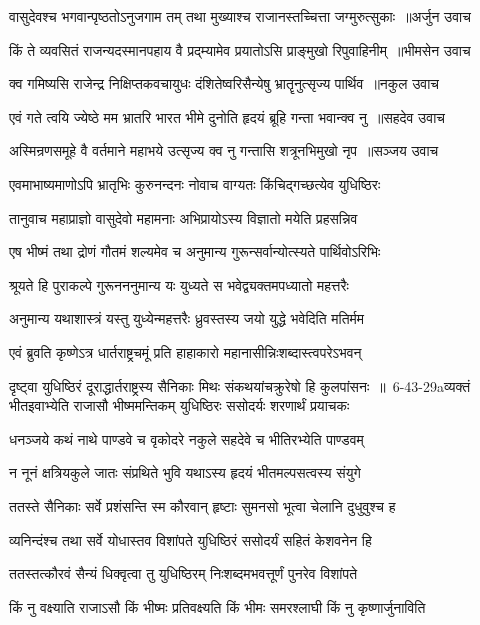 \threelineshloka
{वासुदेवश्च भगवान्पृष्ठतोऽनुजगाम तम्}
{तथा मुख्याश्च राजानस्तच्चित्ता जग्मुरुत्सुकाः ॥अर्जुन उवाच}
{}


\threelineshloka
{किं ते व्यवसितं राजन्यदस्मानपहाय वै}
{प्रद्म्यामेव प्रयातोऽसि प्राङ्मुखो रिपुवाहिनीम् ॥भीमसेन उवाच}
{}


\threelineshloka
{क्व गमिष्यसि राजेन्द्र निक्षिप्तकवचायुधः}
{दंशितेष्वरिसैन्येषु भ्रातॄनुत्सृज्य पार्थिव ॥नकुल उवाच}
{}


\threelineshloka
{एवं गते त्वयि ज्येष्ठे मम भ्रातरि भारत}
{भीमे दुनोति हृदयं ब्रूहि गन्ता भवान्क्व नु ॥सहदेव उवाच}
{}


\threelineshloka
{अस्मिन्रणसमूहे वै वर्तमाने महाभये}
{उत्सृज्य क्व नु गन्तासि शत्रूनभिमुखो नृप ॥सञ्जय उवाच}
{}


\twolineshloka
{एवमाभाष्यमाणोऽपि भ्रातृभिः कुरुनन्दनः}
{नोवाच वाग्यतः किंचिद्गच्छत्येव युधिष्ठिरः}


\twolineshloka
{तानुवाच महाप्राज्ञो वासुदेवो महामनाः}
{अभिप्रायोऽस्य विज्ञातो मयेति प्रहसन्निव}


\twolineshloka
{एष भीष्मं तथा द्रोणं गौतमं शल्यमेव च}
{अनुमान्य गुरून्सर्वान्योत्स्यते पार्थिवोऽरिभिः}


\twolineshloka
{श्रूयते हि पुराकल्पे गुरूनननुमान्य यः}
{युध्यते स भवेद्व्यक्तमपध्यातो महत्तरैः}


\twolineshloka
{अनुमान्य यथाशास्त्रं यस्तु युध्येन्महत्तरैः}
{ध्रुवस्तस्य जयो युद्धे भवेदिति मतिर्मम}


\twolineshloka
{एवं ब्रुवति कृष्णेऽत्र धार्तराष्ट्रचमूं प्रति}
{हाहाकारो महानासीन्निःशब्दास्त्वपरेऽभवन्}


\threelineshloka
{दृष्ट्वा युधिष्ठिरं दूराद्धार्तराष्ट्रस्य सैनिकाः}
{मिथः संकथयांचक्रुरेषो हि कुलपांसनः ॥ 6-43-29aव्यक्तं भीतइवाभ्येति राजासौ भीष्ममन्तिकम्}
{युधिष्ठिरः ससोदर्यः शरणार्थं प्रयाचकः}


\twolineshloka
{धनञ्जये कथं नाथे पाण्डवे च वृकोदरे}
{नकुले सहदेवे च भीतिरभ्येति पाण्डवम्}


\twolineshloka
{न नूनं क्षत्रियकुले जातः संप्रथिते भुवि}
{यथाऽस्य हृदयं भीतमल्पसत्वस्य संयुगे}


\twolineshloka
{ततस्ते सैनिकाः सर्वे प्रशंसन्ति स्म कौरवान्}
{हृष्टाः सुमनसो भूत्वा चेलानि दुधुवुश्च ह}


\twolineshloka
{व्यनिन्दंश्च तथा सर्वे योधास्तव विशांपते}
{युधिष्ठिरं ससोदर्यं सहितं केशवनेन हि}


\twolineshloka
{ततस्तत्कौरवं सैन्यं धिक्वृत्वा तु युधिष्ठिरम्}
{निःशब्दमभवत्तूर्णं पुनरेव विशांपते}


\twolineshloka
{किं नु वक्ष्याति राजाऽसौ किं भीष्मः प्रतिवक्ष्यति}
{किं भीमः समरश्लाघी किं नु कृष्णार्जुनाविति}


